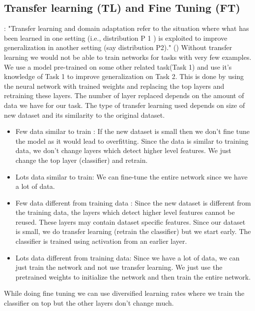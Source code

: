     \subsection{Transfer learning (TL) and Fine Tuning (FT)}:
    "Transfer learning and domain adaptation refer to the situation where what has been learned in one setting (i.e., distribution P 1 ) is exploited to improve generalization in another setting (say distribution P2)." (\cite{Goodfellow-et-al-2016})
    Without transfer learning we would not be able to train networks for tasks with very few examples. 
    We use a model pre-trained on some other related task(Task 1) and use it's knowledge of Task 1 to improve generalization on Task 2. 
    This is done by using the neural network with trained weights and replacing the top layers and retraining these layers. 
    The number of layer replaced depends on the amount of data we have for our task. 
    The type of transfer learning used depends on size of new dataset and its similarity to the original dataset.
    \begin{itemize}
        \item Few data similar to train : If the new dataset is small then we don't fine tune the model as it would lead to overfitting. 
        Since the data is similar to training data, we don't change layers which detect higher level features. 
        We just change the top layer (classifier) and retrain.
        \item Lots data similar to train: We can fine-tune the entire network since we have a lot of data.
        \item Few data different from training data : Since the new dataset is different from the training data, the layers which detect higher level features cannot be reused. These layers may contain dataset specific features. Since our dataset is small, we do transfer learning (retrain the classifier) but we start early. The classifier is trained using activation from an earlier layer.
        \item Lots data different from training data: Since we have a lot of data, we can just train the network and not use transfer learning. 
        We just use the pretrained weights to initialize the network and then train the entire network.
    \end{itemize}
    While doing fine tuning we can use diversified learning rates where we train the classifier on top but the other layers don't change much.